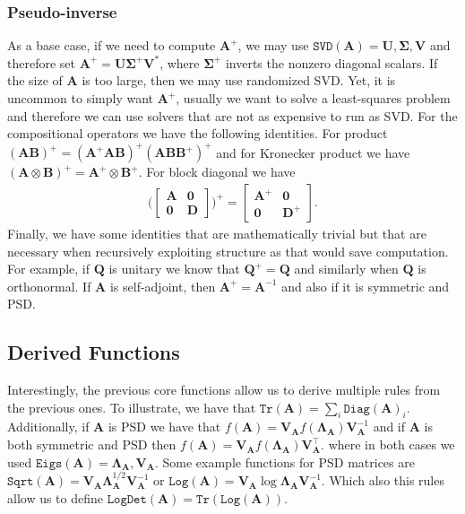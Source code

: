 \documentclass{article}
\newcommand{\mbf}[1]{{\boldsymbol{\mathbf{#1}}}}
\renewcommand{\bm}{\mbf}
\begin{document}
\subsubsection{Pseudo-inverse}
As a base case, if we need to compute $\bm{A}^{+}$, we may use $\texttt{SVD}\left(\bm{A}\right)= \bm{U}, \bm{\Sigma}, \bm{V}$
and therefore set $\bm{A}^{+} = \bm{U}\bm{\Sigma}^{+} \bm{V}^{*}$, where $\bm{\Sigma}^{+}$ inverts the nonzero diagonal scalars.
If the size of $\bm{A}$ is too large, then we may use randomized SVD.
Yet, it is uncommon to simply want $\bm{A}^{+}$, usually we want to solve a least-squares problem and therefore
we can use solvers that are not as expensive to run as SVD.
For the compositional operators we have the following identities.
For product $\left(\bm{A} \bm{B}\right)^{+} = \left(\bm{A}^{+} \bm{A} \bm{B}\right)^{+} \left(\bm{A}\bm{B} \bm{B}^{+}\right)^{+}$
and for Kronecker product we have $\left(\bm{A} \otimes \bm{B}\right)^{+} = \bm{A}^{+} \otimes \bm{B}^{+}$.
For block diagonal we have
\begin{equation*}
    \begin{split}
      \bigg({\begin{bmatrix} \bm{A} & \bm{0} \\ \bm{0} & \bm{D} \end{bmatrix} }\bigg)^{+}
        =
      \begin{bmatrix} \bm{A}^{+} & \bm{0} \\ \bm{0} & \bm{D}^{+} \end{bmatrix}
  .
    \end{split}
\end{equation*}
Finally, we have some identities that are mathematically trivial but that are necessary when recursively exploiting structure as
that would save computation. For example, if $\bm{Q}$ is unitary we know that $\bm{Q}^{+} = \bm{Q}$ and similarly when $\bm{Q}$ is orthonormal.
If $\bm{A}$ is self-adjoint, then $\bm{A}^{+} = \bm{A}^{-1}$ and also if it is symmetric and PSD.

\subsection{Derived Functions}
Interestingly, the previous core functions allow us to derive multiple rules from the previous ones.
To illustrate, we have that $\texttt{Tr}\left(\bm{A}\right) = \sum_{i}^{} \texttt{Diag}\left(\bm{A}\right)_{i}$.
Additionally, if $\bm{A}$ is PSD we have that $f\left(\bm{A}\right) = \bm{V}_{\bm{A}} f\left(\bm{\Lambda}_{\bm{A}}\right) \bm{V}_{\bm{A}}^{-1}$
and if $\bm{A}$ is both symmetric and PSD then $f\left(\bm{A}\right) = \bm{V}_{\bm{A}} f\left(\bm{\Lambda}_{\bm{A}}\right) \bm{V}_{\bm{A}}^{\intercal}$.
where in both cases we used $\texttt{Eigs}\left(\bm{A}\right) = \bm{\Lambda}_{\bm{A}}, \bm{V}_{\bm{A}}$.
Some example functions for PSD matrices are $\texttt{Sqrt}\left(\bm{A}\right) = \bm{V}_{\bm{A}} \bm{\Lambda}_{\bm{A}}^{1/2} \bm{V}_{\bm{A}}^{-1}$
or $\texttt{Log}\left(\bm{A}\right) = \bm{V}_{\bm{A}} \log\bm{\Lambda}_{\bm{A}} \bm{V}_{\bm{A}}^{-1}$.
Which also this rules allow us to define $\texttt{LogDet}\left(\bm{A}\right) = \texttt{Tr}\left(\texttt{Log}\left(\bm{A}\right)\right)$.
\end{document}
